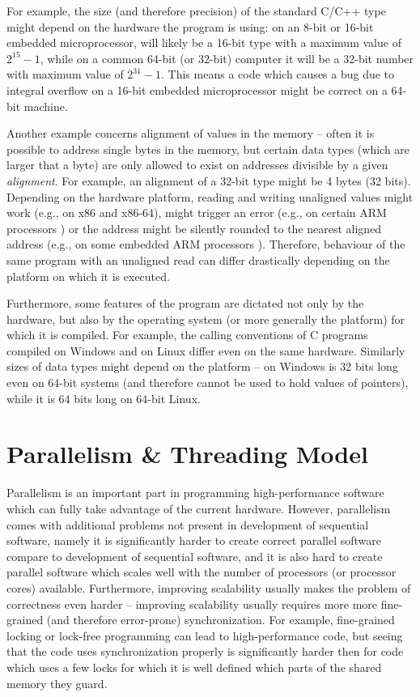 For example, the size (and therefore precision) of the standard C/C++ type
 might depend on the hardware the program is using: on an 8-bit or
16-bit embedded microprocessor,  will likely be a 16-bit type with a
maximum value of $2^{15} - 1$, while on a common 64-bit (or 32-bit) computer it
will be a 32-bit number with maximum value of $2^{31}-1$.
This means a code which causes a bug due to integral overflow on a 16-bit
embedded microprocessor might be correct on a 64-bit machine.

Another example concerns alignment of values in the memory -- often it is
possible to address single bytes in the memory, but certain data types (which
are larger that a byte) are only allowed to exist on addresses divisible by a
given \emph{alignment}.
For example, an alignment of a 32-bit  type might be 4 bytes (32
bits).
Depending on the hardware platform, reading and writing unaligned values might
work (e.g., on x86 and x86-64), might trigger an error (e.g., on certain ARM
processors \cite{??}) or the address might be silently rounded to the nearest
aligned address (e.g., on some embedded ARM processors \cite{??}).
Therefore, behaviour of the same program with an unaligned read can differ
drastically depending on the platform on which it is executed.

Furthermore, some features of the program are dictated not only by the
hardware, but also by the operating system (or more generally the platform) for
which it is compiled.
For example, the calling conventions of C programs compiled on Windows and on
Linux differ even on the same hardware.
Similarly sizes of data types might depend on the platform -- on Windows
 is 32 bits long even on 64-bit systems (and therefore cannot be used
to hold values of pointers), while it is 64 bits long on 64-bit Linux.


\section{Parallelism \& Threading Model} %

Parallelism is an important part in programming high-performance software which
can fully take advantage of the current hardware.
However, parallelism comes with additional problems not present in development
of sequential software, namely it is significantly harder to create correct
parallel software compare to development of sequential software, and it is also
hard to create parallel software which scales well with the number of processors
(or processor cores) available.
Furthermore, improving scalability usually makes the problem of correctness even
harder -- improving scalability usually requires more more fine-grained (and
therefore error-prone) synchronization.
For example, fine-grained locking or lock-free programming can lead to
high-performance code, but seeing that the code uses synchronization properly
is significantly harder then for code which uses a few locks for which it is
well defined which parts of the shared memory they guard.

